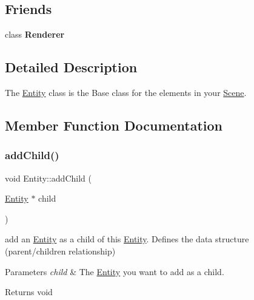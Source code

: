 \subsection*{Friends}
\begin{DoxyCompactItemize}
\item 
\mbox{\label{class_entity_a70538530bc36e033e360880ef311df61}} 
class {\bfseries Renderer}
\end{DoxyCompactItemize}


\subsection{Detailed Description}
The \hyperlink{class_entity}{Entity} class is the Base class for the elements in your \hyperlink{class_scene}{Scene}. 

\subsection{Member Function Documentation}
\mbox{\label{class_entity_a445e5c82020eae36a145a692ff8482bc}} 
\subsubsection{\texorpdfstring{add\+Child()}{addChild()}}
{\footnotesize\ttfamily void Entity\+::add\+Child (\begin{DoxyParamCaption}\item[{\hyperlink{class_entity}{Entity} $\ast$}]{child }\end{DoxyParamCaption})}



add an \hyperlink{class_entity}{Entity} as a child of this \hyperlink{class_entity}{Entity}. Defines the data structure (parent/children relationship) 


\begin{DoxyParams}{Parameters}
{\em child} & The \hyperlink{class_entity}{Entity} you want to add as a child. \\
\hline
\end{DoxyParams}
\begin{DoxyReturn}{Returns}
void 
\end{DoxyReturn}
\mbox{\label{class_entity_a5a45a17006bcba507ffeeb33ddd6269e}} 

